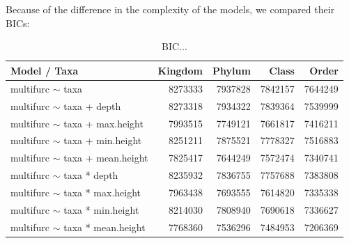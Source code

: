          \\ \\

        Because of the difference in the complexity of the models, we compared their BICs:
        \begin{table}[h]
          \begin{center}
            \begin{tabular}{ |l|r|r|r|r| }
              \hline
              Model / Taxa & Kingdom & Phylum & Class & Order \\
              \hline \hline
              multifurc $\sim$ taxa & 8273333 & 7937828 & 7842157 & 7644249\\
              \hline
              multifurc $\sim$ taxa + depth & 8273318 & 7934322 & 7839364 & \cellcolor{green!50}7539999 \\
              multifurc $\sim$ taxa + max.height & 7993515 & 7749121 & 7661817 & \cellcolor{green!50}7416211 \\
              multifurc $\sim$ taxa + min.height & 8251211 & 7875521  & 7778327 & \cellcolor{green!50}7516883 \\
              multifurc $\sim$ taxa + mean.height & 7825417 & 7644249 & \cellcolor{green!50}7572474 & \cellcolor{green!50}7340741 \\
              \hline
              multifurc $\sim$ taxa * depth & 8235932 & 7836755 & 7757688 & \cellcolor{green!50}7383808 \\
              multifurc $\sim$ taxa * max.height & 7963438 & 7693555 & 7614820 & \cellcolor{green!50}7335338 \\
              multifurc $\sim$ taxa * min.height & 8214030 & 7808940 & 7690618 & \cellcolor{green!50}7336627\\
              multifurc $\sim$ taxa * mean.height & 7768360 & \cellcolor{green!50}7536296 & \cellcolor{green!50}7484953 & \cellcolor{green!50}7206369 \\
              \hline
            \end{tabular} 
          \end{center}
          \caption{BIC...}
          \label{table:...} 
        \end{table}

